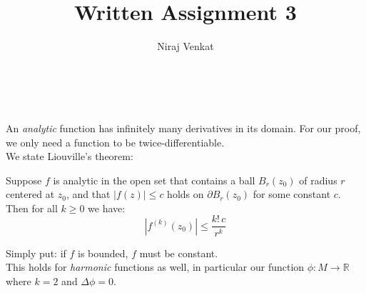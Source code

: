 \documentclass{article}
\def\lap{\Delta}
\def\R{\mathbb{R}}
\def\R{\mathbb{R}}
\begin{document}
\title{Written Assignment 3}

\author{Niraj Venkat}

\date{}

\maketitle

\vspace{.8cm}
\\\\


An \emph{analytic} function has infinitely many derivatives in its domain. For our proof, we only need a function to be
twice-differentiable.\\
We state Liouville's theorem:
\begin{mdframed}
    Suppose $f$ is analytic in the open set that contains a ball $B_r(z_0)$ of radius $r$ centered at $z_0$,
    and that $|f(z)| \le c$ holds on $\partial B_r(z_0)$ for some constant $c$. Then for all $k \ge 0$ we have: $$|f^{(k)}(z_0)| \le \frac{k!\,c}{r^k}$$
\end{mdframed}
Simply put: if $f$ is bounded, $f$ must be constant.\\
This holds for \emph{harmonic} functions as well, 
in particular our function $\phi : M \rightarrow \R$ where $k=2$
and $\lap \phi = 0$.\\\\


\vspace{1.8cm}
\\\\
\end{document}
